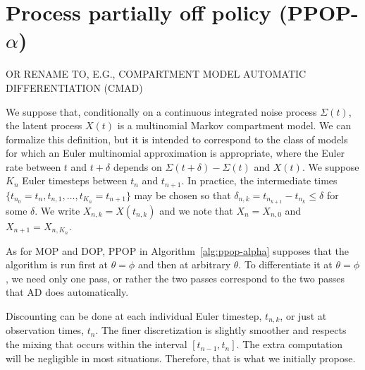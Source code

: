 \documentclass[12p]{article}
\begin{document}
\section{Process partially off policy (PPOP-$\alpha$)}

OR RENAME TO, E.G., COMPARTMENT MODEL AUTOMATIC DIFFERENTIATION (CMAD)

We suppose that, conditionally on a continuous integrated noise process $\Sigma(t)$, the latent process $X(t)$ is a multinomial Markov compartment model.
We can formalize this definition, but it is intended to correspond to the class of models for which an Euler multinomial approximation is appropriate, where the Euler rate between $t$ and $t+\delta$ depends on $\Sigma(t+\delta)-\Sigma(t)$ and $X(t)$.
We suppose $K_n$ Euler timesteps between $t_n$ and $t_{n+1}$.
In practice, the intermediate times $\{t_{n_0}=t_n,t_{n,1},\dots,t_{K_n}=t_{n+1}\}$ may be chosen so that $\delta_{n,k}=t_{n_{k+1}} - t_{n_{k}}\le \delta$ for some $\delta$.
We write $X_{n,k}=X(t_{n,k})$ and we note that $X_n=X_{n,0}$ and $X_{n+1}=X_{n,K_n}$.

As for MOP and DOP, PPOP in Algorithm~\ref{alg:ppop-alpha} supposes that the algorithm is run first at $\theta=\phi$ and then at arbitrary $\theta$.
To differentiate it at $\theta=\phi$, we need only one pass, or rather the two passes correspond to the two passes that AD does automatically. 

Discounting can be done at each individual Euler timestep, $t_{n,k} $, or just at observation times, $t_n$.
The finer discretization is slightly smoother and respects the mixing that occurs within the interval $[t_{n-1},t_n]$.
The extra computation will be negligible in most situations. Therefore, that is what we initially propose.
\end{document}
